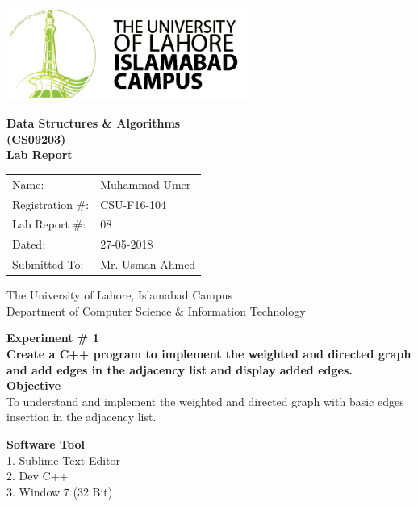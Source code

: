 \documentclass[11pt]{article}            %
\begin{document}
\begin{titlepage}
    \centering
  \vfill
    \includegraphics[width=8cm]{uni_logo.png} \\ 
	\vskip2cm
    {\bfseries\Large
	Data Structures  \& Algorithms \\ (CS09203)\\
	
	\vskip2cm
	Lab Report 
	 
	\vskip2cm
	}    

\begin{center}
\begin{tabular}{ l l  } 

Name: & Muhammad Umer \\ 
Registration \#: & CSU-F16-104 \\ 
Lab Report \#: & 08 \\ 
 Dated:& 27-05-2018\\ 
Submitted To:& Mr. Usman Ahmed\\ 

\end{tabular}
\end{center}
    \vfill
    The University of Lahore, Islamabad Campus\\
Department of Computer Science \& Information Technology
\end{titlepage}


    
    {\bfseries\Large
\centering
	Experiment \# 1 \\

Create a C++ program to implement the weighted and directed graph and add edges in the adjacency list and display added edges.\\
	
	}    
 \vskip1cm
 \textbf {Objective}\\  To understand and implement the weighted and directed graph with basic edges insertion in the adjacency list.
 
 \textbf {Software Tool} \\
1. Sublime Text Editor\\
2. Dev C++\\
3. Window 7 (32 Bit)\\
\end{document}
